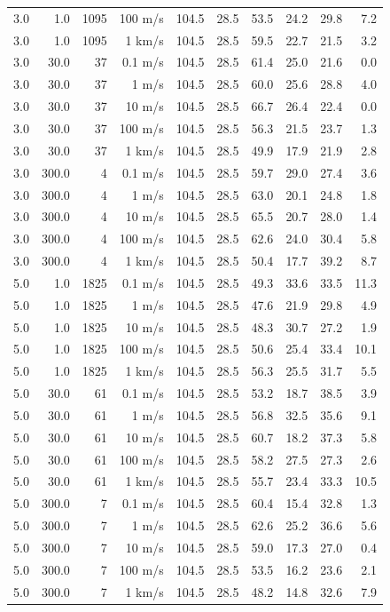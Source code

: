 \begin{table}
\begin{tabular}{rrrrrrrrrr}
3.0 & 1.0 & 1095 & 100 m/s & 104.5 & 28.5 & 53.5 & 24.2 & 29.8 & 7.2 \\
3.0 & 1.0 & 1095 & 1 km/s & 104.5 & 28.5 & 59.5 & 22.7 & 21.5 & 3.2 \\
3.0 & 30.0 & 37 & 0.1 m/s & 104.5 & 28.5 & 61.4 & 25.0 & 21.6 & 0.0 \\
3.0 & 30.0 & 37 & 1 m/s & 104.5 & 28.5 & 60.0 & 25.6 & 28.8 & 4.0 \\
3.0 & 30.0 & 37 & 10 m/s & 104.5 & 28.5 & 66.7 & 26.4 & 22.4 & 0.0 \\
3.0 & 30.0 & 37 & 100 m/s & 104.5 & 28.5 & 56.3 & 21.5 & 23.7 & 1.3 \\
3.0 & 30.0 & 37 & 1 km/s & 104.5 & 28.5 & 49.9 & 17.9 & 21.9 & 2.8 \\
3.0 & 300.0 & 4 & 0.1 m/s & 104.5 & 28.5 & 59.7 & 29.0 & 27.4 & 3.6 \\
3.0 & 300.0 & 4 & 1 m/s & 104.5 & 28.5 & 63.0 & 20.1 & 24.8 & 1.8 \\
3.0 & 300.0 & 4 & 10 m/s & 104.5 & 28.5 & 65.5 & 20.7 & 28.0 & 1.4 \\
3.0 & 300.0 & 4 & 100 m/s & 104.5 & 28.5 & 62.6 & 24.0 & 30.4 & 5.8 \\
3.0 & 300.0 & 4 & 1 km/s & 104.5 & 28.5 & 50.4 & 17.7 & 39.2 & 8.7 \\
5.0 & 1.0 & 1825 & 0.1 m/s & 104.5 & 28.5 & 49.3 & 33.6 & 33.5 & 11.3 \\
5.0 & 1.0 & 1825 & 1 m/s & 104.5 & 28.5 & 47.6 & 21.9 & 29.8 & 4.9 \\
5.0 & 1.0 & 1825 & 10 m/s & 104.5 & 28.5 & 48.3 & 30.7 & 27.2 & 1.9 \\
5.0 & 1.0 & 1825 & 100 m/s & 104.5 & 28.5 & 50.6 & 25.4 & 33.4 & 10.1 \\
5.0 & 1.0 & 1825 & 1 km/s & 104.5 & 28.5 & 56.3 & 25.5 & 31.7 & 5.5 \\
5.0 & 30.0 & 61 & 0.1 m/s & 104.5 & 28.5 & 53.2 & 18.7 & 38.5 & 3.9 \\
5.0 & 30.0 & 61 & 1 m/s & 104.5 & 28.5 & 56.8 & 32.5 & 35.6 & 9.1 \\
5.0 & 30.0 & 61 & 10 m/s & 104.5 & 28.5 & 60.7 & 18.2 & 37.3 & 5.8 \\
5.0 & 30.0 & 61 & 100 m/s & 104.5 & 28.5 & 58.2 & 27.5 & 27.3 & 2.6 \\
5.0 & 30.0 & 61 & 1 km/s & 104.5 & 28.5 & 55.7 & 23.4 & 33.3 & 10.5 \\
5.0 & 300.0 & 7 & 0.1 m/s & 104.5 & 28.5 & 60.4 & 15.4 & 32.8 & 1.3 \\
5.0 & 300.0 & 7 & 1 m/s & 104.5 & 28.5 & 62.6 & 25.2 & 36.6 & 5.6 \\
5.0 & 300.0 & 7 & 10 m/s & 104.5 & 28.5 & 59.0 & 17.3 & 27.0 & 0.4 \\
5.0 & 300.0 & 7 & 100 m/s & 104.5 & 28.5 & 53.5 & 16.2 & 23.6 & 2.1 \\
5.0 & 300.0 & 7 & 1 km/s & 104.5 & 28.5 & 48.2 & 14.8 & 32.6 & 7.9 \\
\hline
\end{tabular}
\end{table}
